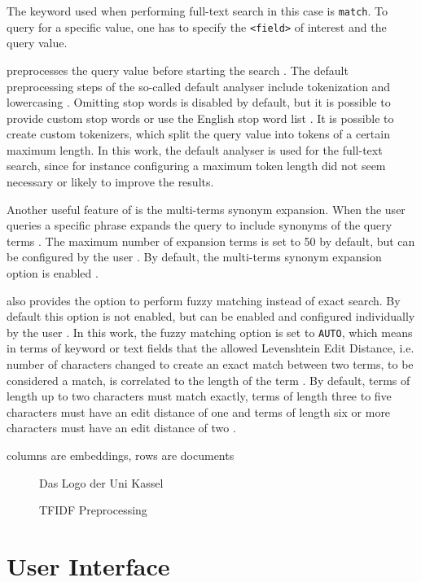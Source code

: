 

The keyword used when performing full-text search in this case is \texttt{match}.
To query for a specific value, one has to specify the \texttt{<field>} of interest and the query value.

\databaseName{} preprocesses the query value before starting the search \cite{Elasticsearch-text-analyser}.
The default preprocessing steps of the so-called default analyser include tokenization and lowercasing \cite{Elasticsearch-standard-analyser}. 
Omitting stop words is disabled by default, but it is possible to provide custom stop words or use the English stop word list \cite{Elasticsearch-standard-analyser}.
It is possible to create custom tokenizers, which split the query value into tokens of a certain maximum length.
In this work, the default analyser is used for the full-text search, since for instance configuring a maximum token length did not seem necessary or likely to improve the results.

Another useful feature of \databaseName{} is the multi-terms synonym expansion.
When the user queries a specific phrase \databaseName{} expands the query to include synonyms of the query terms \cite{Elasticsearch-synonyms}.
The maximum number of expansion terms is set to 50 by default, but can be configured by the user \cite{Elasticsearch-match}.
By default, the multi-terms synonym expansion option is enabled \cite{Elasticsearch-match}.

\databaseName{} also provides the option to perform fuzzy matching instead of exact search.
By default this option is not enabled, but can be enabled and configured individually by the user \cite{Elasticsearch-match}.
In this work, the fuzzy matching option is set to \texttt{AUTO}, which means in terms of keyword or text fields that the allowed Levenshtein Edit Distance, 
i.e. number of characters changed to create an exact match between two terms, to be considered a match, is correlated to the length of the term \cite{Elasticsearch-fuzziness}.
By default, terms of length up to two characters must match exactly, terms of length three to five characters must have an edit distance of one and 
terms of length six or more characters must have an edit distance of two \cite{Elasticsearch-fuzziness}.



columns are embeddings, rows are documents

\begin{figure}[htp] %
    \centering
    
    \caption{Das Logo der Uni Kassel}
    \label{fig:pdf2db}
\end{figure}

\begin{figure}[htp] %
    \centering
    
    \caption{TFIDF Preprocessing}
    \label{fig:preprocessing}
\end{figure}

\section{User Interface}\label{sec:ui}